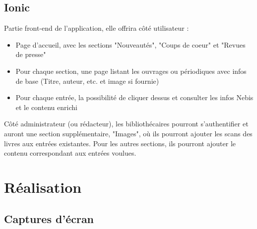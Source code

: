\documentclass[a4paper, 12pt]{article}
\begin{document}
\subsection{Ionic}
Partie front-end de l'application, elle offrira côté utilisateur :
\begin{itemize}
    \item Page d'accueil, avec les sections "Nouveautés", "Coups de coeur" et "Revues de presse"
    \item Pour chaque section, une page listant les ouvrages ou périodiques avec infos de base
        (Titre, auteur, etc. et image si fournie)
    \item Pour chaque entrée, la possibilité de cliquer dessus et consulter les infos Nebis et le contenu enrichi
\end{itemize}
Côté administrateur (ou rédacteur), les bibliothécaires pourront s'authentifier et auront une section supplémentaire,
"Images", où ils pourront ajouter les scans des livres aux entrées existantes. Pour les autres sections, ils
pourront ajouter le contenu correspondant aux entrées voulues.


\section{Réalisation}
\subsection{Captures d'écran}
\end{document}
